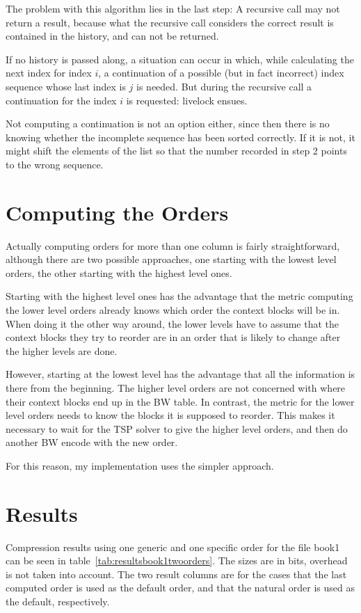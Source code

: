 \documentclass[a4paper]{scrreprt}
\begin{document}
The problem with this algorithm lies in the last step: A recursive call may not
return a result, because what the recursive call considers the correct result is
contained in the history, and can not be returned.

If no history is passed along, a situation can occur in which, while calculating
the next index for index \(i\), a continuation of a possible (but in fact
incorrect) index sequence whose last index is \(j\) is needed. But during the
recursive call a continuation for the index \(i\) is requested: livelock ensues.

Not computing a continuation is not an option either, since then there is no
knowing whether the incomplete sequence has been sorted correctly. If it is not,
it might shift the elements of the list so that the number recorded in step 2
points to the wrong sequence.

\section{Computing the Orders}

Actually computing orders for more than one column is fairly straightforward,
although there are two possible approaches, one starting with the lowest level
orders, the other starting with the highest level ones.

Starting with the highest level ones has the advantage that the metric
computing the lower level orders already knows which order the context blocks
will be in.
When doing it the other way around, the lower levels have to assume that the
context blocks they try to reorder are in an order that is likely to change
after the higher levels are done.

However, starting at the lowest level has the advantage that all the information
is there from the beginning. The higher level orders are not concerned with
where their context blocks end up in the BW table. In contrast, the metric for
the lower level orders needs to know the blocks it is supposed to reorder. This
makes it necessary to wait for the TSP solver to give the higher level orders,
and then do another BW encode with the new order.

For this reason, my implementation uses the simpler approach.

\section{Results}

Compression results using one generic and one specific order for the file book1
can be seen in table~\ref{tab:resultsbook1twoorders}. The sizes are in bits,
overhead is not taken into account. The two result columns are for the cases
that the last computed order is used as the default order, and that the natural
order is used as the default, respectively.
\end{document}
